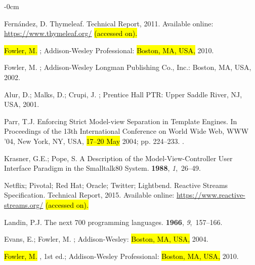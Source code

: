 \documentclass[software,article,accept,pdftex,moreauthors]{Definitions/mdpi}
\begin{document}
\begin{adjustwidth}{-\extralength}{0cm}
\begin{thebibliography}{999}
Fernández, D.
\newblock Thymeleaf.
\newblock Technical Report, 2011. Available online: \url{https://www.thymeleaf.org/} \hl{(accessed on).}

\hl{Fowler, M.} %
; Addison-Wesley Professional: \hl{Boston, MA, USA,} 2010.

Fowler, M.
; Addison-Wesley
  Longman Publishing Co., Inc.: Boston, MA, USA, 2002.

Alur, D.; Malks, D.; Crupi, J.
;
  Prentice Hall PTR: Upper Saddle River, NJ, USA, 2001.

Parr, T.J.
\newblock Enforcing Strict Model-view Separation in Template Engines.
\newblock In Proceedings of the 13th International
  Conference on World Wide Web, WWW '04, New York, NY, USA, \hl{17--20 May} 2004; pp.
  224--233.
.

Krasner, G.E.; Pope, S.
\newblock A Description of the Model-View-Controller User Interface Paradigm in
  the Smalltalk80 System.
 {\bf 1988}, {\em
  1},~26--49.

{Netflix}; {Pivotal}; {Red Hat}; {Oracle}; {Twitter}; {Lightbend}.
\newblock Reactive Streams Specification.
\newblock Technical Report, 2015. Available online: \url{https://www.reactive-streams.org/} \hl{(accessed on).}

Landin, P.J.
\newblock The next 700 programming languages.
 {\bf 1966}, {\em 9},~157--166.

Evans, E.; Fowler, M.
; Addison-Wesley: \hl{Boston, MA, USA,} 2004.

\hl{Fowler, M.}
, 1st ed.; Addison-Wesley
  Professional: \hl{Boston, MA, USA,} 2010.


\end{thebibliography}
\end{adjustwidth}
\end{document}
